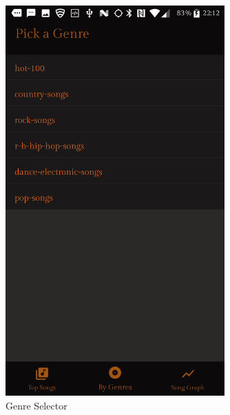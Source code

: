\documentclass{article}
\begin{document}
\begin{figure}[H]
  \centering
  \begin{minipage}{.5\textwidth}
    \centering
    \includegraphics[width=0.75\textwidth]{GenreList.png}
    \caption{Genre Selector}
    \label{label}
  \end{minipage}%
  \begin{minipage}{.5\textwidth}
    \centering

\end{minipage}
\end{figure}
\end{document}
